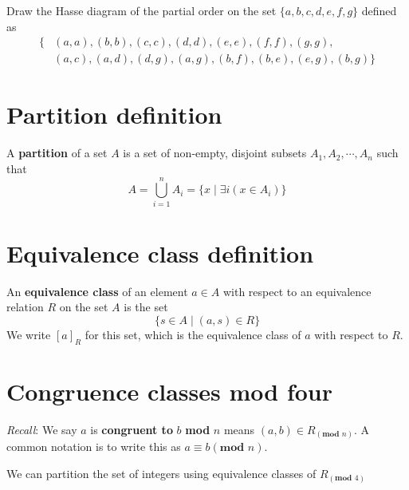 \documentclass[12pt, oneside]{article}
\begin{document}
Draw the Hasse diagram of the partial order on the set $\{a,b,c,d,e,f,g\}$ defined as
\begin{align*}
    \{  &(a,a), (b,b), (c,c), (d,d), (e,e), (f,f), (g,g), \\
        &(a,c), (a,d), (d,g), (a,g), (b,f), (b,e), (e,g), (b,g) \}
\end{align*}

\vspace{100pt}

%
 \vfill
\section*{Partition definition}


A {\bf partition} of a set $A$ is a set of non-empty, disjoint subsets 
$A_1, A_2, \cdots, A_n$ such that 
\[
    A = \bigcup_{i=1}^{n} A_i = \{ x \mid \exists i (x \in A_i) \}
\] \vfill
\section*{Equivalence class definition}


An {\bf equivalence class} of an element $a \in A$ 
with respect to an equivalence relation $R$ on the set $A$ is the set 
\[
    \{s \in A \mid (a, s) \in R \}
\] 
We write $[a]_R$ for this set, which is the equivalence class of $a$ with respect to $R$. \vfill
\section*{Congruence classes mod four}


{\it Recall}: We say $a$ is {\bf congruent to} $b$ \textbf{mod} $n$ 
means $(a, b) \in R_{(\textbf{mod } n)}$. 
A common notation is to write this as $a \equiv b (\textbf{mod } n)$.

We can partition the set of integers using equivalence classes of  $R_{(\textbf{mod } 4)}$
\end{document}
